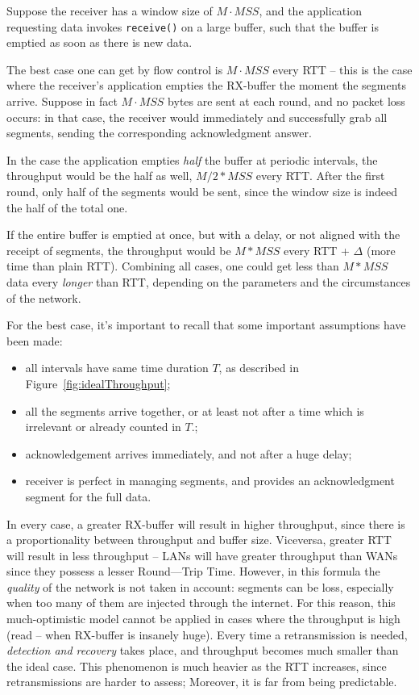 \documentclass[10pt]{extbook}
\begin{document}
Suppose the receiver has a window size of $M \cdot MSS$, and the application
requesting data invokes \texttt{receive()} on a large buffer, such that the
buffer is emptied as soon as there is new data.

The best case one can get by flow control is $M \cdot MSS$ every RTT \--- this is
the case where the receiver's application empties the RX-buffer the moment the
segments arrive. Suppose in fact $M \cdot MSS$ bytes are sent at each round,
and no packet loss occurs: in that case, the receiver would immediately and
successfully grab all segments, sending the corresponding acknowledgment
answer.

In the case the application empties \emph{half} the buffer at periodic
intervals, the throughput would be the half as well, $M/2 * MSS$ every RTT.
After the first round, only half of the segments would be sent, since the
window size is indeed the half of the total one. 

If the entire buffer is emptied at once, but with a delay, or not aligned with
the receipt of segments, the throughput would be $M * MSS$ every RTT + $\Delta$
(more time than plain RTT). Combining all cases, one could get less than $M *
MSS$ data every \emph{longer} than RTT, depending on the parameters and the
circumstances of the network.

For the best case, it's important to recall that some important assumptions
have been made:
\begin{itemize}
    \item all intervals have same time duration $T$, as described in
        Figure~\ref{fig:idealThroughput};
    \item all the segments arrive together, or at least not after a time which
        is irrelevant or already counted in $T$.;
    \item acknowledgement arrives immediately, and not after a huge delay;
    \item receiver is perfect in managing segments, and provides an
        acknowledgment segment for the full data.
\end{itemize}

In every case, a greater RX-buffer will result in higher throughput, since
there is a proportionality between throughput and buffer size. Viceversa,
greater RTT will result in less throughput \--- LANs will have greater
throughput than WANs since they possess a lesser Round\----Trip Time. However,
in this formula the \emph{quality} of the network is not taken in account:
segments can be loss, especially when too many of them are injected through the
internet. For this reason, this much-optimistic model cannot be applied in
cases where the throughput is high (read \--- when RX-buffer is insanely huge).
Every time a retransmission is needed, \emph{detection and recovery} takes
place, and throughput becomes much smaller than the ideal case. This
phenomenon is much heavier as the RTT increases, since retransmissions are
harder to assess; Moreover, it is far from being predictable.
\end{document}
